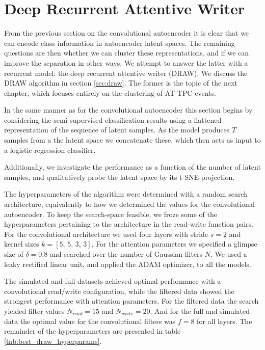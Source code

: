 \section{Deep Recurrent Attentive Writer }

From the previous section on the convolutional autoencoder it is clear that we can encode class information in autoencoder latent spaces. The remaining questions are then whether we can cluster these representations, and if we can improve the separation in other ways. We attempt to answer the latter with a recurrent model: the deep recurrent attentive writer (DRAW). We discuss the DRAW algorithm in section \ref{sec:draw}. The former is the topic of the next chapter, which focuses entirely on the clustering of AT-TPC events.

In the same manner as for the convolutional autoencoder this section begins by considering the semi-supervised classification results using a flattened representation of the sequence of latent samples. As the model produces $T$ samples from a the latent space we concatenate these, which then acts as input to a logistic regression classifier.

Additionally, we investigate the performance as a function of the number of latent samples, and qualitatively probe the latent space by its t-SNE projection.

The hyperparameters of the algorithm were determined with a random search architecture, equivalently to how we determined the values for the convolutional autoencoder. To keep the search-space feasible, we froze some of the hyperparameters pertaining to the architecture in the read-write function pairs. For the convolutional architecture we used four layers with stride $s=2$ and kernel sizes $k= [5,\, 5,\, 3,\, 3]$. For the attention parameters we specified a glimpse size of $\delta=0.8$ and searched over the number of Gaussian filters $N$. We used a leaky rectified linear unit, and applied the ADAM optimizer, to all the models.

The simulated and full datasets achieved optimal performance with a convolutional read/write configuration, while the filtered data showed the strongest performance with attention parameters. For the filtered data the search yielded filter values $N_{read} = 15$ and $N_{write}=20$. And for the full and simulated data the optimal value for the convolutional filters was $f=8$ for all layers. The remainder of the hyperparameters are presented in table \ref{tab:best_draw_hyperparams}.



